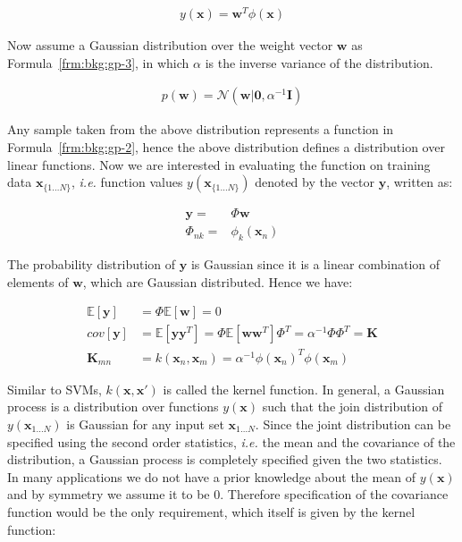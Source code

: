 \begin{align}
  y(\mathbf{x}) = \mathbf{w}^T \phi(\mathbf{x})
  \label{frm:bkg:gp-2}
\end{align}

Now assume a Gaussian distribution over the weight vector $\mathbf{w}$ as Formula~\ref{frm:bkg:gp-3}, in which $\alpha$ is the inverse variance of the distribution.

\begin{align}
  p(\mathbf{w}) = \mathcal{N}(\mathbf{w}|\mathbf{0}, \alpha^{-1}\mathbf{I})
  \label{frm:bkg:gp-3}
\end{align}

Any sample taken from the above distribution represents a function in Formula~\ref{frm:bkg:gp-2}, hence the above distribution defines a distribution over linear functions. Now we are interested in evaluating the function on training data $\mathbf{x}_{\{1\ldots N\}}$, \emph{i.e.} function values $y(\mathbf{x}_{\{1\ldots N\}})$ denoted by the vector $\mathbf{y}$, written as:

\begin{align}
  \mathbf{y} = &\Phi\mathbf{w} \nonumber \\
  \Phi_{nk} = &\phi_k(\mathbf{x}_n)
  \label{frm:bkg:gp-4}
\end{align}

The probability distribution of $\mathbf{y}$ is Gaussian since it is a linear combination of elements of $\mathbf{w}$, which are Gaussian distributed. Hence we have:

\begin{align}
  \mathbb{E}[\mathbf{y}] & = \Phi\mathbb{E}[\mathbf{w}] = 0 \nonumber \\
  cov[\mathbf{y}] & = \mathbb{E}[\mathbf{yy}^T] = \Phi\mathbb{E}[\mathbf{ww}^T]\Phi^T = \alpha^{-1}\Phi\Phi^T = \mathbf{K} \nonumber \\
  \mathbf{K}_{mn} & = k(\mathbf{x}_n,\mathbf{x}_m) = \alpha^{-1}\phi(\mathbf{x}_n)^T\phi(\mathbf{x}_m)
  \label{frm:bkg:gp-5}
\end{align}

Similar to SVMs, $k(\mathbf{x},\mathbf{x}')$ is called the kernel function. In general, a Gaussian process is a distribution over functions $y(\mathbf{x})$ such that the join distribution of $y(\mathbf{x}_{1\ldots N})$ is Gaussian for any input set $\mathbf{x}_{1\ldots N}$. Since the joint distribution can be specified using the second order statistics, \emph{i.e.} the mean and the covariance of the distribution, a Gaussian process is completely specified given the two statistics. In many applications we do not have a prior knowledge about the mean of $y(\mathbf{x})$ and by symmetry we assume it to be $0$. Therefore specification of the covariance function would be the only requirement, which itself is given by the kernel function:

